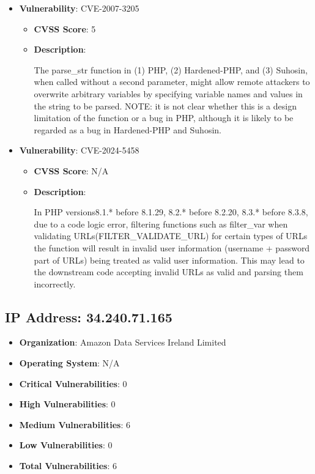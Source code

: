 \documentclass{article}
\begin{document}
\begin{itemize}
        \item \textbf{Vulnerability}: CVE-2007-3205
        \begin{itemize}
            \item \textbf{CVSS Score}:  5 
            \item \textbf{Description}:
            \parbox[t]{0.9\linewidth}{
                \ttfamily The parse\_str function in (1) PHP, (2) Hardened-PHP, and (3) Suhosin, when called without a second parameter, might allow remote attackers to overwrite arbitrary variables by specifying variable names and values in the string to be parsed.  NOTE: it is not clear whether this is a design limitation of the function or a bug in PHP, although it is likely to be regarded as a bug in Hardened-PHP and Suhosin.
            }
        \end{itemize}
    
        \item \textbf{Vulnerability}: CVE-2024-5458
        \begin{itemize}
            \item \textbf{CVSS Score}:  N/A 
            \item \textbf{Description}:
            \parbox[t]{0.9\linewidth}{
                \ttfamily In PHP versions8.1.* before 8.1.29, 8.2.* before 8.2.20, 8.3.* before 8.3.8, due to a code logic error, filtering functions such as filter\_var when validating URLs(FILTER\_VALIDATE\_URL) for certain types of URLs the function will result in invalid user information (username + password part of URLs) being treated as valid user information. This may lead to the downstream code accepting invalid URLs as valid and parsing them incorrectly.
            }
        \end{itemize}
    
\end{itemize}




\clearpage



\subsection*{IP Address: 34.240.71.165}

\begin{itemize}
    \item \textbf{Organization}: Amazon Data Services Ireland Limited
    \item \textbf{Operating System}:  N/A 
    \item \textbf{Critical Vulnerabilities}: 0
    \item \textbf{High Vulnerabilities}: 0
    \item \textbf{Medium Vulnerabilities}: 6
    \item \textbf{Low Vulnerabilities}: 0
    \item \textbf{Total Vulnerabilities}: 6
\end{itemize}
\end{document}
